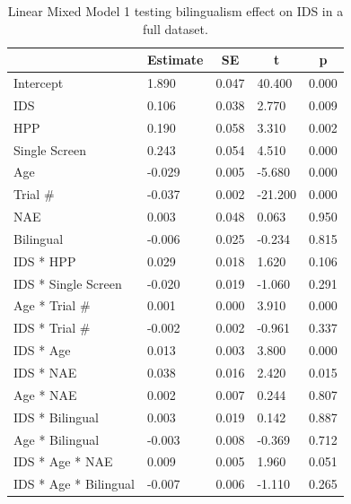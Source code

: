 \documentclass[english,,man,floatsintext]{apa6}
\begin{document}
\begin{table}[tbp]

\begin{center}
\begin{threeparttable}

\caption{\label{tab:unnamed-chunk-8}Linear Mixed Model 1 testing bilingualism effect on IDS in a full dataset.}

\begin{tabular}{lllll}
\toprule
 & \multicolumn{1}{c}{Estimate} & \multicolumn{1}{c}{SE} & \multicolumn{1}{c}{t} & \multicolumn{1}{c}{p}\\
\midrule
Intercept & 1.890 & 0.047 & 40.400 & 0.000\\
IDS & 0.106 & 0.038 & 2.770 & 0.009\\
HPP & 0.190 & 0.058 & 3.310 & 0.002\\
Single Screen & 0.243 & 0.054 & 4.510 & 0.000\\
Age & -0.029 & 0.005 & -5.680 & 0.000\\
Trial \# & -0.037 & 0.002 & -21.200 & 0.000\\
NAE & 0.003 & 0.048 & 0.063 & 0.950\\
Bilingual & -0.006 & 0.025 & -0.234 & 0.815\\
IDS * HPP & 0.029 & 0.018 & 1.620 & 0.106\\
IDS * Single Screen & -0.020 & 0.019 & -1.060 & 0.291\\
Age * Trial \# & 0.001 & 0.000 & 3.910 & 0.000\\
IDS * Trial \# & -0.002 & 0.002 & -0.961 & 0.337\\
IDS * Age & 0.013 & 0.003 & 3.800 & 0.000\\
IDS * NAE & 0.038 & 0.016 & 2.420 & 0.015\\
Age * NAE & 0.002 & 0.007 & 0.244 & 0.807\\
IDS * Bilingual & 0.003 & 0.019 & 0.142 & 0.887\\
Age * Bilingual & -0.003 & 0.008 & -0.369 & 0.712\\
IDS * Age * NAE & 0.009 & 0.005 & 1.960 & 0.051\\
IDS * Age * Bilingual & -0.007 & 0.006 & -1.110 & 0.265\\
\bottomrule
\end{tabular}

\end{threeparttable}
\end{center}

\end{table}
\end{document}
